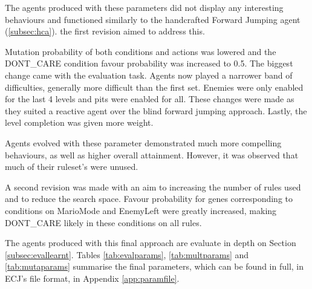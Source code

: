 The agents produced with these parameters did not display any interesting behaviours and functioned similarly to the handcrafted Forward Jumping agent (\ref{subsec:hca}). the first revision aimed to address this.

Mutation probability of both conditions and actions was lowered and the {\footnotesize DONT\_CARE} condition favour probability was increased to 0.5. The biggest change came with the evaluation task. Agents now played a narrower band of difficulties, generally more difficult than the first set. Enemies were only enabled for the last 4 levels and pits were enabled for all. These changes were made as they suited a reactive agent over the blind forward jumping approach. Lastly, the level completion was given more weight.

Agents evolved with these parameter demonstrated much more compelling behaviours, as well as higher overall attainment. However, it was observed that much of their ruleset's were unused.

A second revision was made with an aim to increasing the number of rules used and to reduce the search space. Favour probability for genes corresponding to conditions on MarioMode and EnemyLeft were greatly increased, making {\footnotesize DONT\_CARE} likely in these conditions on all rules.

The agents produced with this final approach are evaluate in depth on Section \ref{subsec:evallearnt}. Tables \ref{tab:evalparams}, \ref{tab:multparams} and \ref{tab:mutaparams} summarise the final parameters, which can be found in full, in ECJ's file format, in Appendix \ref{app:paramfile}.

